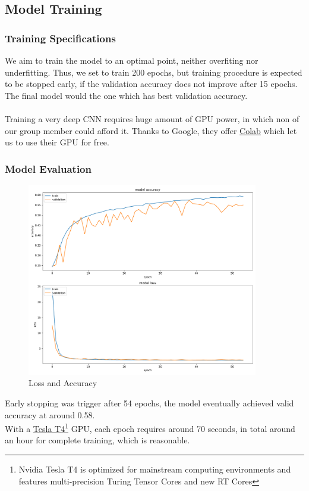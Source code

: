 \documentclass[11pt,a4paper]{article}
\begin{document}
    \subsection{Model Training}
    \subsubsection{Training Specifications}
    We aim to train the model to an optimal point, neither overfiting nor underfitting. Thus, we set to train 200 epochs, but training procedure is expected to be stopped early, if the validation accuracy does not improve after 15 epochs. The final model would the one which has best validation accuracy. \\
    \\
    Training a very deep CNN requires huge amount of GPU power, in which non of our group member could afford it. Thanks to Google, they offer \href{https://research.google.com/colaboratory/}{Colab} which let us to use their GPU for free.
    
    \subsubsection{Model Evaluation}
    \begin{figure}[H]
        \centering
        \includegraphics[width = 0.9\textwidth]{emotion_detection/plot/history.pdf}
        \caption{Loss and Accuracy}
        \label{fig:loss_acc}
    \end{figure}
    Early stopping was trigger after 54 epochs, the model eventually achieved valid accuracy at around 0.58. \\
    With a \href{https://www.nvidia.com/en-us/data-center/tesla-t4/}{Tesla T4}\footnote{Nvidia Tesla T4 is optimized for mainstream computing environments and features multi-precision Turing Tensor Cores and new RT Cores} GPU, each epoch requires around 70 seconds, in total around an hour for complete training, which is reasonable.
    
\end{document}
